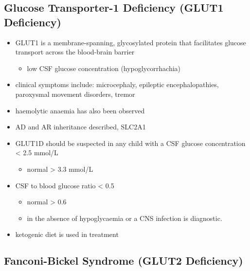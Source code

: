 \documentclass{scrartcl}
\begin{document}
\subsection{Glucose Transporter-1 Deficiency (GLUT1 Deficiency)}
\label{sec:org8733712}
\begin{itemize}
\item GLUT1 is a membrane-spanning, glycosylated protein that facilitates
glucose transport across the blood-brain barrier
\begin{itemize}
\item low CSF glucose concentration (hypoglycorrhachia)
\end{itemize}

\item clinical symptoms include: microcephaly, epileptic encephalopathies,
paroxysmal movement disorders, tremor
\item haemolytic anaemia has also been observed

\item AD and AR inheritance described, SLC2A1

\item GLUT1D should be suspected in any child with a CSF glucose
concentration \textless{} 2.5 mmol/L 
\begin{itemize}
\item normal \textgreater{} 3.3 mmol/L
\end{itemize}

\item CSF to blood glucose ratio \textless{} 0.5 
\begin{itemize}
\item normal \textgreater{} 0.6
\item in the absence of hypoglycaemia or a CNS infection is diagnostic.
\end{itemize}
\item ketogenic diet is used in treatment
\end{itemize}

\subsection{Fanconi-Bickel Syndrome (GLUT2 Deficiency)}
\label{sec:orgd0eafe9}
\end{document}
